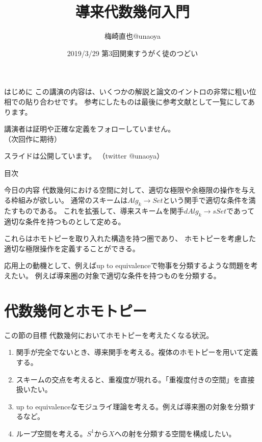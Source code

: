 \documentclass[dvipdfmx]{beamer}
\title{導来代数幾何入門}
\author{梅崎直也@unaoya}
\date{2019/3/29 第3回関東すうがく徒のつどい}
\begin{document}
\begin{frame}
\maketitle
\end{frame}

\begin{frame}{はじめに}
この講演の内容は、いくつかの解説と論文のイントロの非常に粗い位相での貼り合わせです。
参考にしたものは最後に参考文献として一覧にしてあります。

講演者は証明や正確な定義をフォローしていません。\\
（次回作に期待）

スライドは公開しています。
（twitter @unaoya）
\end{frame}

\begin{frame}{目次}
\tableofcontents
\end{frame} 

\begin{frame}{今日の内容}
代数幾何における空間に対して、適切な極限や余極限の操作を与える枠組みが欲しい。
通常のスキームは$Alg_k \to Set$という関手で適切な条件を満たすものである。
これを拡張して、導来スキームを関手$dAlg_k \to sSet$であって適切な条件を持つものとして定める。

これらはホモトピーを取り入れた構造を持つ圏であり、
ホモトピーを考慮した適切な極限操作を定義することができる。

応用上の動機として、例えばup to equivalenceで物事を分類するような問題を考えたい。
例えば導来圏の対象で適切な条件を持つものを分類する。
\end{frame}

\section{代数幾何とホモトピー}

\begin{frame}{この節の目標}
代数幾何においてホモトピーを考えたくなる状況。

\begin{enumerate}
\item 関手が完全でないとき、導来関手を考える。複体のホモトピーを用いて定義する。
\item スキームの交点を考えると、重複度が現れる。「重複度付きの空間」を直接扱いたい。
\item up to equivalenceなモジュライ理論を考える。例えば導来圏の対象を分類するなど。
\item ループ空間を考える。$S^1$から$X$への射を分類する空間を構成したい。
\end{enumerate}

\end{frame}
\end{document}
